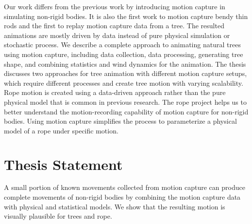 Our work differs from the previous work by introducing motion capture in simulating non-rigid bodies. It is also the first work to motion capture bendy thin rods and the first to replay motion capture data from a tree. The resulted animations are mostly driven by data instead of pure physical simulation or stochastic process. We describe a complete approach to animating natural trees using motion capture, including data collection, data processing, generating tree shape, and combining statistics and wind dynamics for the animation. The thesis discusses two approaches for tree animation with different motion capture setups, which require different processes and create tree motion with varying scalability. Rope motion is created using a data-driven approach rather than the pure physical model that is common in previous research. The rope project helps us to better understand the motion-recording capability of motion capture for non-rigid bodies. Using motion capture simplifies the process to parameterize a physical model of a rope under specific motion.

\section{Thesis Statement}

A small portion of known movements collected from motion capture can produce complete movements of non-rigid bodies by combining the motion capture data with physical and statistical models. We show that the resulting motion is visually plausible for trees and rope.

